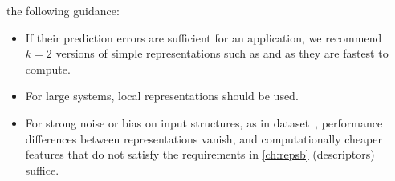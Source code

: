 {} the following guidance:
%
\begin{itemize}
	\item If their prediction errors are sufficient for an application, we recommend $k{=}2$ versions of simple representations such as \sfs and \mbtr as they are fastest to compute. 
	\item For large systems, local representations should be used.
	\item For strong noise or bias on input structures, as in dataset~\dstcou{}, performance differences between representations vanish,
		and computationally cheaper features that do not satisfy the requirements in \cref{ch:repsb} (descriptors) suffice.
\end{itemize}
